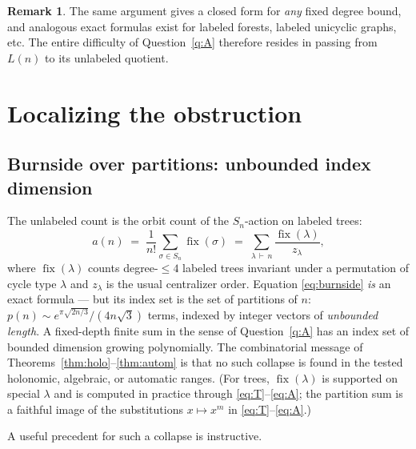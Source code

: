 \documentclass[11pt]{article}
\theoremstyle{definition}
\newtheorem{remark}[theorem]{Remark}
\DeclareMathOperator{\fix}{fix}
\begin{document}
\begin{remark}
The same argument gives a closed form for \emph{any} fixed degree bound, and
analogous exact formulas exist for labeled forests, labeled unicyclic graphs,
etc. The entire difficulty of Question~\ref{q:A} therefore resides in passing
from $L(n)$ to its unlabeled quotient.
\end{remark}

\section{Localizing the obstruction}\label{sec:structure}

\subsection{Burnside over partitions: unbounded index dimension}

The unlabeled count is the orbit count of the $S_n$-action on labeled trees:
\begin{equation}\label{eq:burnside}
a(n)\;=\;\frac{1}{n!}\sum_{\sigma\in S_n}\fix(\sigma)
\;=\;\sum_{\lambda\,\vdash\,n}\frac{\fix(\lambda)}{z_\lambda},
\end{equation}
where $\fix(\lambda)$ counts degree-$\le4$ labeled trees invariant under a
permutation of cycle type $\lambda$ and $z_\lambda$ is the usual centralizer
order. Equation \eqref{eq:burnside} \emph{is} an exact formula --- but its index
set is the set of partitions of $n$: $p(n)\sim e^{\pi\sqrt{2n/3}}/(4n\sqrt3)$
terms, indexed by integer vectors of \emph{unbounded length}. A fixed-depth
finite sum in the sense of Question~\ref{q:A} has an index set of bounded
dimension growing polynomially. The combinatorial message of
Theorems~\ref{thm:holo}--\ref{thm:autom} is that no such collapse is found in
the tested holonomic, algebraic, or automatic ranges. (For trees,
$\fix(\lambda)$ is supported on special $\lambda$ and is computed in practice
through \eqref{eq:T}--\eqref{eq:A}; the partition sum is a faithful image of the
substitutions $x\mapsto x^m$ in \eqref{eq:T}--\eqref{eq:A}.)

A useful precedent for such a collapse is instructive.
\end{document}
